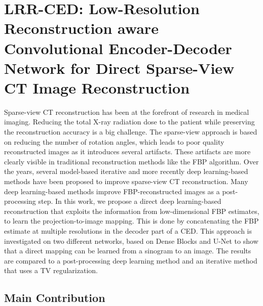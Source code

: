 
\chapter{LRR-CED:  Low-Resolution Reconstruction aware Convolutional Encoder-Decoder Network  for Direct Sparse-View CT Image Reconstruction} %

\label{Chapter4} %

Sparse-view \ac{CT} reconstruction has been at the forefront of research in medical imaging. Reducing the total X-ray radiation dose to the patient while preserving the reconstruction accuracy is a big challenge. The sparse-view approach is based on reducing the number of rotation angles, which leads to poor quality reconstructed images as it introduces several artifacts. These artifacts are more clearly visible in traditional reconstruction methods like the \ac{FBP} algorithm. Over the years, several model-based iterative and more recently deep learning-based methods have been proposed to improve sparse-view \ac{CT} reconstruction. Many deep learning-based methods improve \ac{FBP}-reconstructed images as a post-processing step. In this work, we propose a direct deep learning-based reconstruction that exploits the information from low-dimensional \ac{FBP} estimates, to learn the  projection-to-image mapping. This is done by concatenating the \ac{FBP} estimate at multiple resolutions in the decoder part of a \ac{CED}. This approach is investigated on two different networks, based on Dense Blocks and U-Net to show that a direct mapping can be learned from a sinogram to an image.  The results are compared to a post-processing deep learning method and an iterative method that uses a \ac{TV} regularization. 


\section{Main Contribution}

